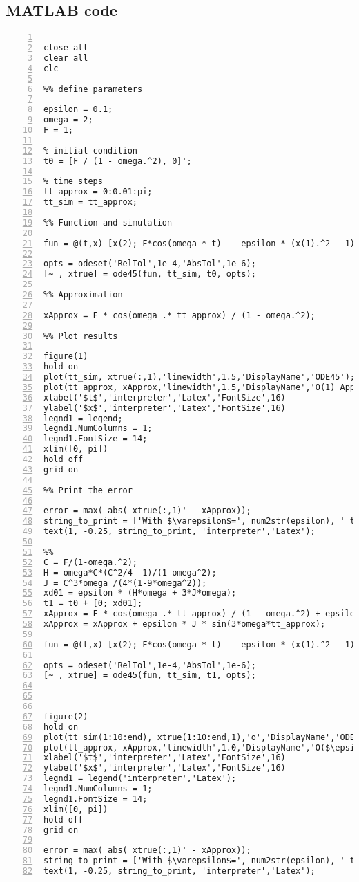 \documentclass[twoside,10pt,a4paper]{article}
\begin{document}
\subsection*{MATLAB code}
\begin{Verbatim}[numbers = left]
%% Initiate Script

close all
clear all
clc

%% define parameters

epsilon = 0.1;
omega = 2;
F = 1;

% initial condition
t0 = [F / (1 - omega.^2), 0]';

% time steps
tt_approx = 0:0.01:pi;
tt_sim = tt_approx;

%% Function and simulation

fun = @(t,x) [x(2); F*cos(omega * t) -  epsilon * (x(1).^2 - 1).*x(2) - x(1)];

opts = odeset('RelTol',1e-4,'AbsTol',1e-6);
[~ , xtrue] = ode45(fun, tt_sim, t0, opts);

%% Approximation

xApprox = F * cos(omega .* tt_approx) / (1 - omega.^2);

%% Plot results

figure(1)
hold on
plot(tt_sim, xtrue(:,1),'linewidth',1.5,'DisplayName','ODE45');
plot(tt_approx, xApprox,'linewidth',1.5,'DisplayName','O(1) Approximation');
xlabel('$t$','interpreter','Latex','FontSize',16)
ylabel('$x$','interpreter','Latex','FontSize',16)
legnd1 = legend;
legnd1.NumColumns = 1;
legnd1.FontSize = 14;
xlim([0, pi])
hold off
grid on

%% Print the error

error = max( abs( xtrue(:,1)' - xApprox));
string_to_print = ['With $\varepsilon$=', num2str(epsilon), ' the maximal error is ', num2str(error)];
text(1, -0.25, string_to_print, 'interpreter','Latex');

%%
C = F/(1-omega.^2);
H = omega*C*(C^2/4 -1)/(1-omega^2);
J = C^3*omega /(4*(1-9*omega^2));
xd01 = epsilon * (H*omega + 3*J*omega);
t1 = t0 + [0; xd01];
xApprox = F * cos(omega .* tt_approx) / (1 - omega.^2) + epsilon * H * sin(omega*tt_approx);
xApprox = xApprox + epsilon * J * sin(3*omega*tt_approx);

fun = @(t,x) [x(2); F*cos(omega * t) -  epsilon * (x(1).^2 - 1).*x(2) - x(1)];

opts = odeset('RelTol',1e-4,'AbsTol',1e-6);
[~ , xtrue] = ode45(fun, tt_sim, t1, opts);



figure(2)
hold on
plot(tt_sim(1:10:end), xtrue(1:10:end,1),'o','DisplayName','ODE45');
plot(tt_approx, xApprox,'linewidth',1.0,'DisplayName','O($\epsilon$) Approximation');
xlabel('$t$','interpreter','Latex','FontSize',16)
ylabel('$x$','interpreter','Latex','FontSize',16)
legnd1 = legend('interpreter','Latex');
legnd1.NumColumns = 1;
legnd1.FontSize = 14;
xlim([0, pi])
hold off
grid on

error = max( abs( xtrue(:,1)' - xApprox));
string_to_print = ['With $\varepsilon$=', num2str(epsilon), ' the maximal error is ', num2str(error)];
text(1, -0.25, string_to_print, 'interpreter','Latex');
\end{Verbatim}
\end{document}
